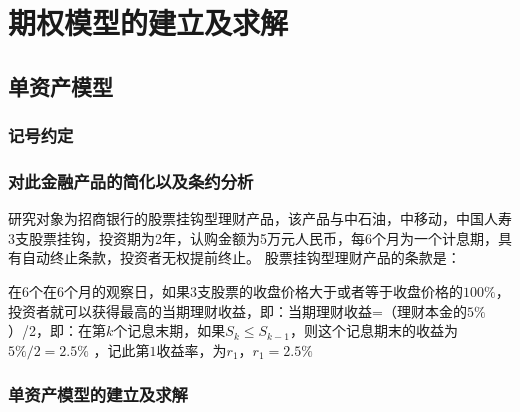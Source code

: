 \chapter{期权模型的建立及求解}
\section{单资产模型}
\subsection{记号约定}
\subsection{对此金融产品的简化以及条约分析}
研究对象为招商银行的股票挂钩型理财产品，该产品与中石油，中移动，中国人寿3支股票挂钩，投资期为2年，认购金额为5万元人民币，每6个月为一个计息期，具有自动终止条款，投资者无权提前终止。
股票挂钩型理财产品的条款是：
\begin{tjutiaokuan}
	在6个在6个月的观察日，如果3支股票的收盘价格大于或者等于收盘价格的$100\%$，投资者就可以获得最高的当期理财收益，即：当期理财收益=（理财本金的$5\%$）/2，即：在第$k$个记息末期，如果$S_k \leq S_{k-1}$，则这个记息期末的收益为$5\% /2=2.5\%$ ，记此第$1$收益率，为$r_1$，$r_1=2.5\%$
\end{tjutiaokuan}

\subsection{单资产模型的建立及求解}